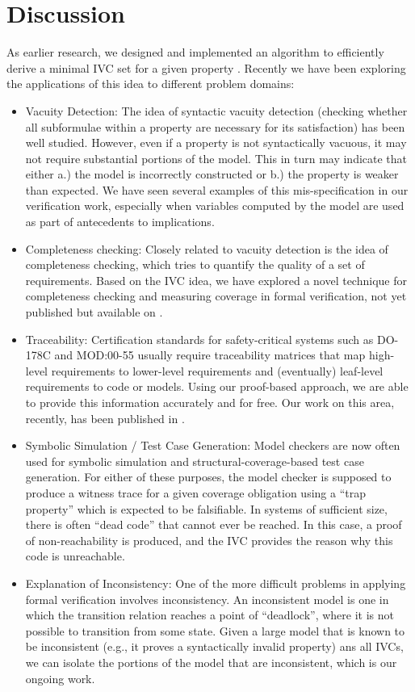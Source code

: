 \section{Discussion}
\label{sec:disc} 	

As earlier research, we designed and implemented an algorithm to efficiently derive a minimal IVC set for a given property \cite{Ghass16}. Recently we have been exploring the applications of this idea to different problem domains:
\begin{itemize}
  \item Vacuity Detection: The idea of syntactic vacuity detection (checking whether all subformulae within a property are necessary for its satisfaction) has been well studied.   However, even if a property is not syntactically vacuous, it may not require substantial portions of the model.  This in turn may indicate that either a.) the model is incorrectly constructed or b.) the property is weaker than expected.  We have seen several examples of this mis-specification in our verification work, especially when variables computed by the model are used as part of antecedents to implications.
  \item Completeness checking: Closely related to vacuity detection is the idea of completeness checking, which tries to quantify the quality of a set of requirements.  Based on the IVC idea, we have explored a novel technique for completeness checking and measuring coverage in formal verification, not yet published but available on \cite{expr}.
  \item Traceability: Certification standards for safety-critical systems such as DO-178C and MOD:00-55 usually require traceability matrices that map high-level requirements to lower-level requirements and (eventually) leaf-level requirements to code or models.  Using our proof-based approach, we are able to provide this information accurately and for free. Our work on this area, recently, has been published in \cite{Murugesan16:renext}.
  \item Symbolic Simulation / Test Case Generation:  Model checkers are now often used for symbolic simulation and structural-coverage-based test case generation.  For either of these purposes, the model checker is supposed to produce a witness trace for a given coverage obligation using a ``trap property'' which is expected to be falsifiable.  In systems of sufficient size, there is often ``dead code'' that cannot ever be reached.  In this case, a proof of non-reachability is produced, and the IVC provides the reason why this code is unreachable.
  \item Explanation of Inconsistency: One of the more difficult problems in applying formal verification involves inconsistency.  An inconsistent model is one in which the transition relation reaches a point of “deadlock”, where it is not possible to transition from some state.  Given a large model that is known to be inconsistent (e.g., it proves a syntactically invalid property) ans all IVCs, we can isolate the portions of the model that are inconsistent, which is our ongoing work.
\end{itemize}

